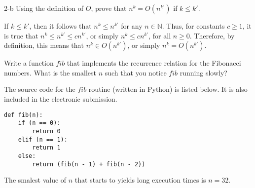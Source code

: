 \documentclass[11pt]{article}
\begin{document}
\begin{prob}{2-b}
Using the definition of $O$, prove that $n^{k} = O(n^{k'})$ if $k \leq k'$.
\end{prob}
\begin{sol} 

If $k \leq k'$, then it follows that $n^{k} \leq n^{k'}$ for any $n \in \mathbb{N}$. Thus, for constants $c \geq 1$, it is true that $n^{k} \leq n^{k'} \leq cn^{k'}$, or simply $n^{k} \leq cn^{k'}$, for all $n \geq 0$. Therefore, by definition, this means that $n^{k} \in O(n^{k'})$, or simply $n^{k} = O(n^{k'})$.

\end{sol}

\begin{prob}{3}
Write a function $fib$ that implements the recurrence relation for the Fibonacci numbers. What is the smallest $n$ such that you notice $fib$ running slowly?
\end{prob}
\begin{sol} 
The source code for the $fib$ routine (written in Python) is listed below. It is also included in the electronic submission.

\begin{lstlisting}
def fib(n):
	if (n == 0):
		return 0
	elif (n == 1):
		return 1
	else:
		return (fib(n - 1) + fib(n - 2))
\end{lstlisting}

The smalest value of $n$ that starts to yields long execution times is $n = 32$.

\end{sol}
\end{document}
